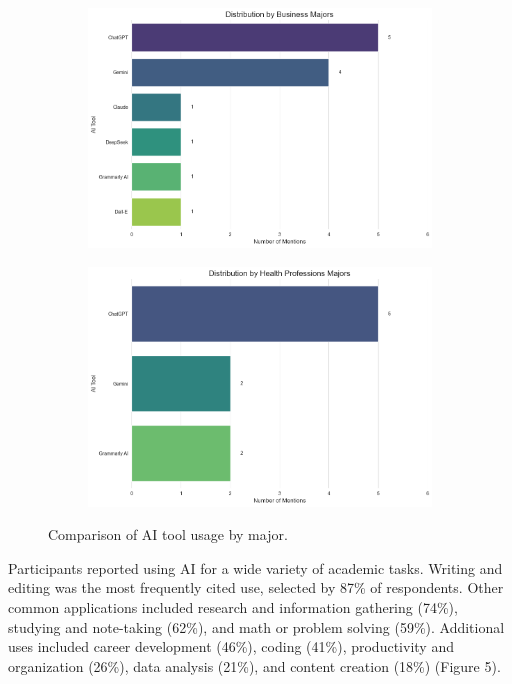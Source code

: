 \documentclass[12pt]{article}
\begin{document}
\begin{figure}[H]
\begin{subfigure}[b]{0.45\textwidth}
    \includegraphics[width=\textwidth]{fig4-3.png} %
    \label{fig:subfig1b}
  \end{subfigure}
  \hfill %
  \begin{subfigure}[b]{0.45\textwidth}
    \includegraphics[width=\textwidth]{fig4-4.png} %
    \label{fig:subfig1b}
  \end{subfigure}
  \caption{Comparison of AI tool usage by major.}
  \label{fig:subfigures1}
\end{figure}


Participants reported using AI for a wide variety of academic tasks. Writing and editing was the most frequently cited use, selected by 87\% of respondents. Other common applications included research and information gathering (74\%), studying and note-taking (62\%), and math or problem solving (59\%). Additional uses included career development (46\%), coding (41\%), productivity and organization (26\%), data analysis (21\%), and content creation (18\%) (Figure 5).
\end{document}
